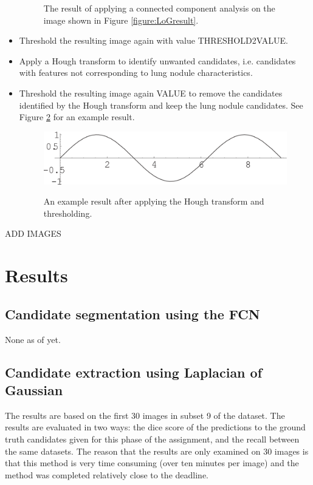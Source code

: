 \documentclass{article}
\begin{document}
\begin{itemize}
\begin{figure}[h]
	\caption{The result of applying a connected component analysis on the image shown in Figure \ref{figure:LoGresult}. \label{figure:conncomp}}
	\end{figure}
\item Threshold the resulting image again with value THRESHOLD2VALUE.
\item Apply a Hough transform to identify unwanted candidates, i.e. candidates with features not corresponding to lung nodule characteristics.
\item Threshold the resulting image again VALUE to remove the candidates identified by the Hough transform and keep the lung nodule candidates. See Figure \ref{figure:Houghresult} for an example result.
	\begin{figure}[h]
	\centering
	{\includegraphics[width=0.7\linewidth]{./figure.png}}
	\caption{An example result after applying the Hough transform and thresholding. \label{figure:Houghresult}}
	\end{figure}
\end{itemize}
ADD IMAGES


\section{Results}\label{sec:results}
\subsection{Candidate segmentation using the FCN}
None as of yet.

\subsection{Candidate extraction using Laplacian of Gaussian}
The results are based on the first 30 images in subset 9 of the dataset. The results are evaluated in two ways: the dice score of the predictions to the ground truth candidates given for this phase of the assignment, and the recall between the same datasets. The reason that the results are only examined on 30 images is that this method is very time consuming (over ten minutes per image) and the method was completed relatively close to the deadline.
\end{document}
